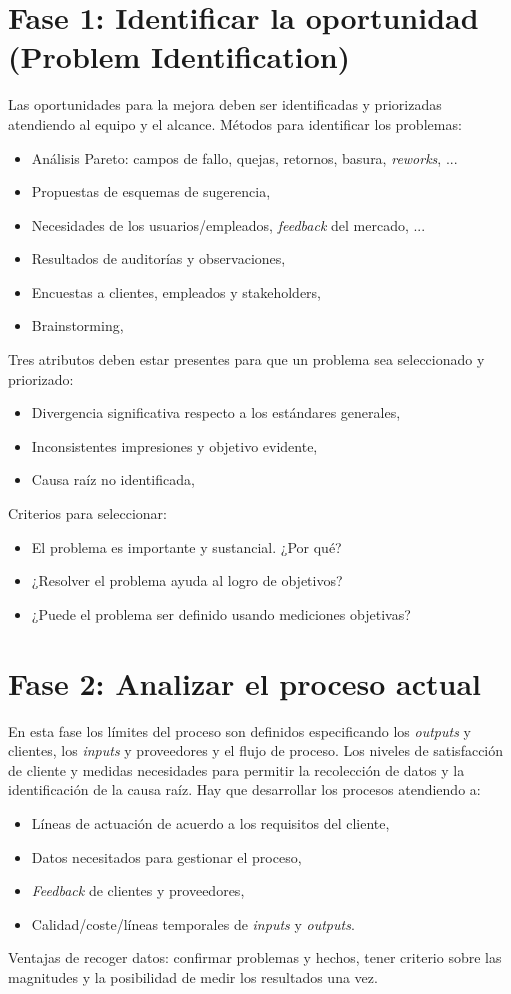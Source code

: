 \documentclass[oneside]{book}
\begin{document}
\section{Fase 1: Identificar la oportunidad (Problem Identification)}
Las oportunidades para la mejora deben ser identificadas y priorizadas atendiendo al equipo y el alcance. Métodos para identificar los problemas: 
\begin{itemize}
	\item Análisis Pareto: campos de fallo, quejas, retornos, basura, \textit{reworks}, ...
	\item Propuestas de esquemas de sugerencia, 
	\item Necesidades de los usuarios/empleados, \textit{feedback} del mercado, ...
	\item Resultados de auditorías y observaciones,
	\item Encuestas a clientes, empleados y stakeholders,
	\item Brainstorming, 
\end{itemize}
Tres atributos deben estar presentes para que un problema sea seleccionado y priorizado:
\begin{itemize}
	\item Divergencia significativa respecto a los estándares generales,
	\item Inconsistentes impresiones y objetivo evidente,
	\item Causa raíz no identificada,
\end{itemize}
Criterios para seleccionar:
\begin{itemize}
	\item El problema es importante y sustancial. ¿Por qué?
	\item ¿Resolver el problema ayuda al logro de objetivos?
	\item ¿Puede el problema ser definido usando mediciones objetivas?
\end{itemize}

\section{Fase 2: Analizar el proceso actual}
En esta fase los límites del proceso son definidos especificando los \textit{outputs} y clientes, los \textit{inputs} y proveedores y el flujo de proceso. Los niveles de satisfacción de cliente y medidas necesidades para permitir la recolección de datos y la identificación de la causa raíz. Hay que desarrollar los procesos atendiendo a: 
\begin{itemize}
	\item Líneas de actuación de acuerdo a los requisitos del cliente,
	\item Datos necesitados para gestionar el proceso,
	\item \textit{Feedback} de clientes y proveedores,
	\item Calidad/coste/líneas temporales de \textit{inputs} y \textit{outputs}.
\end{itemize}
Ventajas de recoger datos: confirmar problemas y hechos, tener criterio sobre las magnitudes y la posibilidad de medir los resultados una vez.
\end{document}
